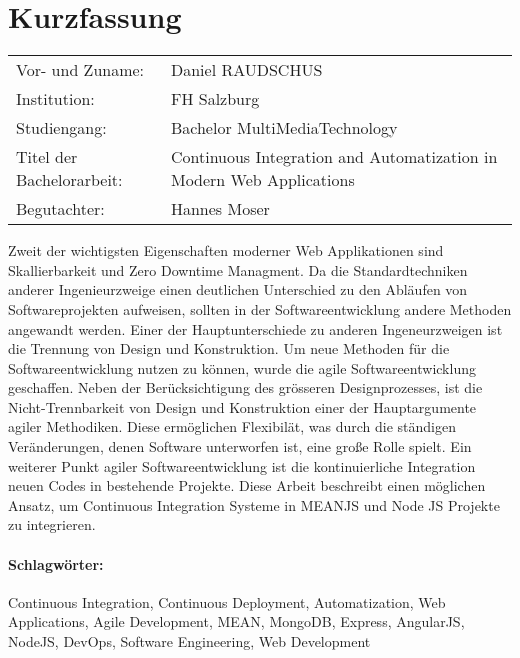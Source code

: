 \section*{Kurzfassung}
\begin{tabular}{l l}
Vor- und Zuname:& Daniel RAUDSCHUS\\
Institution: & FH Salzburg\\
Studiengang: &  Bachelor MultiMediaTechnology\\
Titel der Bachelorarbeit: & Continuous Integration and Automatization in Modern Web Applications\\
Begutachter: & Hannes Moser\\
\end{tabular}
\vspace{0.5cm}

Zweit der wichtigsten Eigenschaften moderner Web Applikationen sind Skallierbarkeit und Zero Downtime Managment. Da die Standardtechniken anderer Ingenieurzweige
einen deutlichen Unterschied zu den Abläufen von Softwareprojekten aufweisen, sollten in der Softwareentwicklung andere Methoden angewandt werden. Einer der
Hauptunterschiede zu anderen Ingeneurzweigen ist die Trennung von Design und Konstruktion. Um neue Methoden für die Softwareentwicklung nutzen zu können,
wurde die agile Softwareentwicklung geschaffen. Neben der Berücksichtigung des grösseren Designprozesses, ist die Nicht-Trennbarkeit von Design und Konstruktion
einer der Hauptargumente agiler Methodiken. Diese ermöglichen Flexibilät, was durch die ständigen Veränderungen, denen Software unterworfen ist, eine große
Rolle spielt. Ein weiterer Punkt agiler Softwareentwicklung ist die kontinuierliche Integration neuen Codes in bestehende Projekte. Diese Arbeit
beschreibt einen möglichen Ansatz, um Continuous Integration Systeme in MEANJS und Node JS Projekte zu integrieren.

\paragraph{Schlagwörter:}
Continuous Integration, Continuous Deployment, Automatization, Web Applications, Agile Development, MEAN, MongoDB, Express, AngularJS, NodeJS, DevOps, Software Engineering, Web Development
